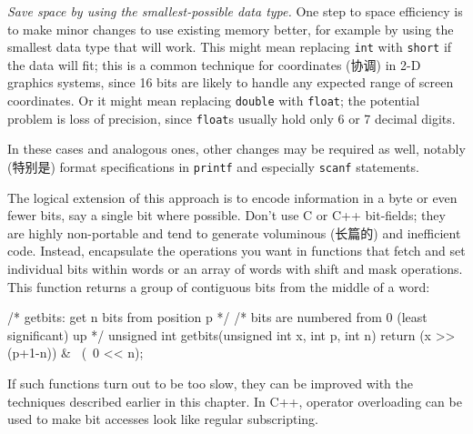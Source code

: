 \emph{Save space by using the smallest-possible data type.} One step to
space efficiency is to make minor changes to use existing memory better,
for example by using the smallest data type that will work. This might mean
replacing \verb'int' with \verb'short' if the data will fit; this is a
common technique for coordinates (协调) in 2-D graphics systems, since 16
bits are likely to handle any expected range of screen coordinates. Or it
might mean replacing \verb'double' with \verb'float'; the potential problem
is loss of precision, since \verb'float's usually hold only 6 or 7 decimal
digits.

In these cases and analogous ones, other changes may be required as well,
notably (特别是) format specifications in \texttt{printf} and especially
\texttt{scanf} statements.

The logical extension of this approach is to encode information in a byte
or even fewer bits, say a single bit where possible. Don't use C or C++
bit-fields; they are highly non-portable and tend to generate voluminous
(长篇的) and inefficient code.  Instead, encapsulate the operations you
want in functions that fetch and set individual bits within words or an
array of words with shift and mask operations. This function returns a
group of contiguous bits from the middle of a word:
\begin{wellcode}
    /* getbits: get n bits from position p */
    /* bits are numbered from 0 (least significant) up */
    unsigned int getbits(unsigned int x, int p, int n)
    {
        return (x >> (p+1-n)) & ~(~0 << n);
    }
\end{wellcode}
If such functions turn out to be too slow, they can be improved with the
techniques described earlier in this chapter. In C++, operator overloading
can be used to make bit accesses look like regular subscripting.

